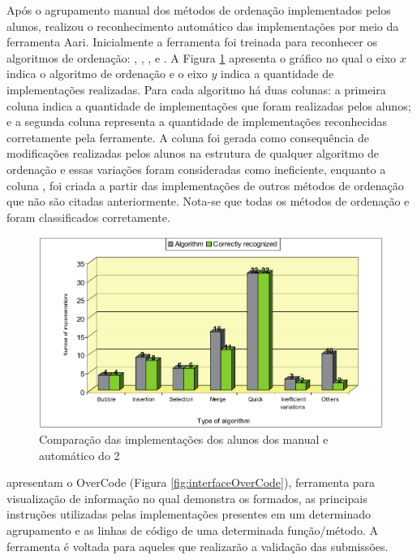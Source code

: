 	    Após o agrupamento manual dos métodos de ordenação implementados pelos alunos,
	     realizou o reconhecimento automático das
	    implementações por meio da ferramenta Aari. Inicialmente a ferramenta foi
	    treinada para reconhecer os algoritmos de ordenação: ,
	    , ,  e
	    . A Figura \ref{fig:clusterAutomatico} apresenta o gráfico
	    no qual o eixo $x$ indica o algoritmo de ordenação e o eixo $y$  indica a
	    quantidade de implementações realizadas. Para cada algoritmo há duas colunas:
	    a primeira coluna indica a quantidade de implementações que foram realizadas
	    pelos alunos; e a segunda coluna representa a quantidade de implementações
	    reconhecidas corretamente pela ferramente. A coluna 
	    foi gerada como consequência de modificações realizadas pelos alunos na
	    estrutura de qualquer algoritmo de ordenação e essas variações foram
	    consideradas como ineficiente, enquanto a coluna , foi
	    criada a partir das implementações de outros métodos de ordenação que
	    não são citadas anteriormente. Nota-se que todas os métodos de ordenação
	     e  foram classificados corretamente.
	    
	    \begin{figure}[ht]
	        \centering
	        \includegraphics[scale=0.33]{imagem/clusterAutomatico.png}
	        \caption{Comparação das implementações dos alunos dos 
	        	manual e automático do  2}
	        \label{fig:clusterAutomatico}
	    \end{figure}
	    
	     apresentam o OverCode (Figura \ref{fig:interfaceOverCode}),
	    ferramenta para visualização de informação no qual demonstra os  formados,
	    as principais instruções utilizadas pelas implementações presentes em um
	    determinado agrupamento e as linhas de código de uma determinada função/método.
	    A ferramenta é voltada para aqueles que realizarão a validação das submissões.
	    
